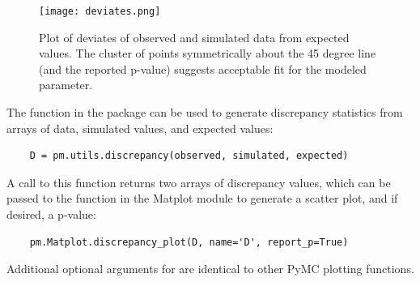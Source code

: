 \begin{figure}[h]
        \begin{center}
        \texttt{[image: deviates.png]}
    \end{center}
    \caption{Plot of deviates of observed and simulated data from expected values. The cluster of points symmetrically about the 45 degree line (and the reported p-value) suggests acceptable fit for the modeled parameter.}
    \label{fig:deviate}
\end{figure}

The  function in the  package can be used to generate discrepancy statistics from arrays of data, simulated values, and expected values:

\begin{verbatim}
	D = pm.utils.discrepancy(observed, simulated, expected)
\end{verbatim}

A call to this function returns two arrays of discrepancy values, which can be passed to the  function in the Matplot module to generate a scatter plot, and if desired, a p-value:

\begin{verbatim}
	pm.Matplot.discrepancy_plot(D, name='D', report_p=True)
\end{verbatim}

Additional optional arguments for  are identical to other PyMC plotting functions.


